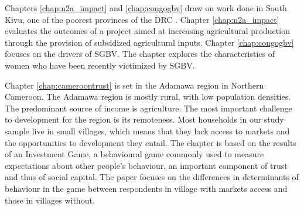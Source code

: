 Chapters \ref{chap:n2a_impact} and \ref{chap:congogbv} draw on work done in South Kivu, one of the poorest provinces of the DRC \citep{Ansoms2009}. Chapter \ref{chap:n2a_impact} evaluates the outcomes of a project aimed at increasing agricultural production through the provision of subsidized agricultural inputs. Chapter \ref{chap:congogbv} focuses on the drivers of SGBV. The chapter explores the characteristics of women who have been recently victimized by SGBV.

Chapter \ref{chap:cameroontrust} is set in the Adamawa region in Northern Cameroon. The Adamawa region is mostly rural, with low population densities. The predominant source of income is agriculture. The most important challenge to development for the region is its remoteness. Most households in our study sample live in small villages, which means that they lack access to markets and the opportunities to development they entail. The chapter is based on the results of an Investment Game, a behavioural game commonly used to measure expectations about other people's behaviour, an important component of trust and thus of social capital. The paper focuses on the differences in determinants of behaviour in the game between respondents in village with markets access and those in villages without.


